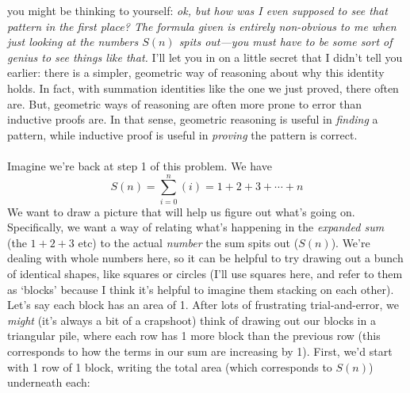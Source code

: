 \documentclass[10pt]{article}
\theoremstyle{definition}
\begin{document}
you might be thinking to yourself: \textit{ok, but how was I even
  supposed to see that pattern in the first place?  The formula given
  is entirely non-obvious to me when just looking at the numbers
  $S(n)$ spits out---you must have to be some sort of genius to see
  things like that.}  I'll let you in on a little secret that I didn't
tell you earlier: there is a simpler, geometric way of reasoning about
why this identity holds.  In fact, with summation identities like the
one we just proved, there often are.  But, geometric ways of reasoning
are often more prone to error than inductive proofs are.  In that
sense, geometric reasoning is useful in \emph{finding} a pattern,
while inductive proof is useful in \emph{proving} the pattern is
correct.  \\~\\
Imagine we're back at step 1 of this problem.  We have
\[S(n) = \sum_{i=0}^n(i) = 1 + 2 + 3 + \cdots + n\]
We want to draw a picture that will help us figure out what's going
on.  Specifically, we want a way of relating what's happening in the
\emph{expanded sum} (the $1+2+3$ etc) to the actual \emph{number} the
sum spits out ($S(n)$).  We're dealing with whole numbers here, so it
can be helpful to try drawing out a bunch of identical shapes, like
squares or circles (I'll use squares here, and refer to them as
`blocks' because I think it's helpful to imagine them stacking on each
other).  Let's say each block has an area of 1.  After lots of
frustrating trial-and-error, we \emph{might} (it's always a bit of a
crapshoot) think of drawing out our blocks in a triangular pile, where
each row has 1 more block than the previous row (this corresponds to
how the terms in our sum are increasing by 1).  First, we'd start with
1 row of 1 block, writing the total area (which corresponds to $S(n)$)
underneath each:
\end{document}
